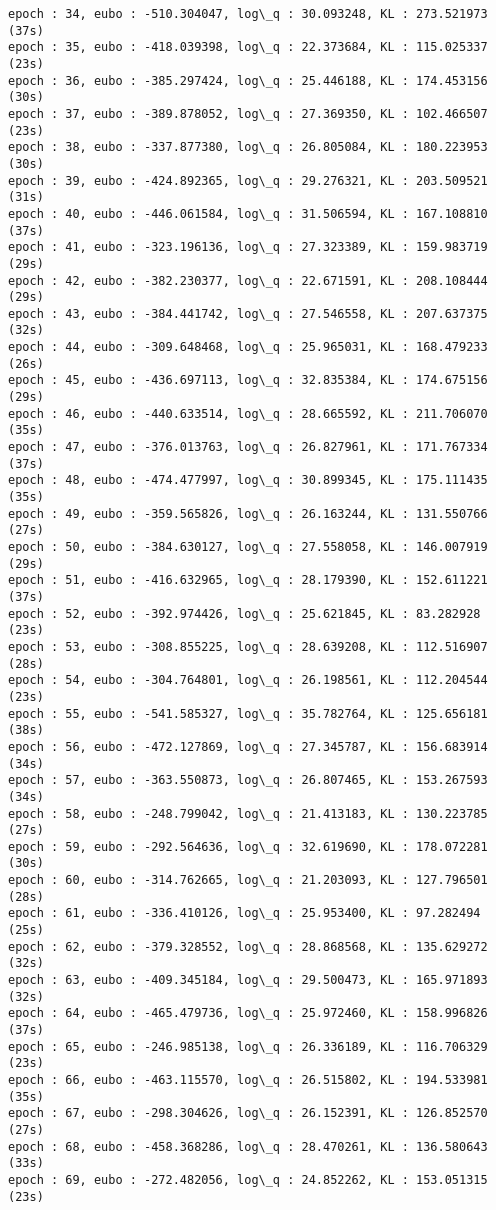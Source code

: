 \documentclass[11pt]{article}
\begin{document}
\begin{Verbatim}[commandchars=\\\{\}]
epoch : 34, eubo : -510.304047, log\_q : 30.093248, KL : 273.521973 (37s)
epoch : 35, eubo : -418.039398, log\_q : 22.373684, KL : 115.025337 (23s)
epoch : 36, eubo : -385.297424, log\_q : 25.446188, KL : 174.453156 (30s)
epoch : 37, eubo : -389.878052, log\_q : 27.369350, KL : 102.466507 (23s)
epoch : 38, eubo : -337.877380, log\_q : 26.805084, KL : 180.223953 (30s)
epoch : 39, eubo : -424.892365, log\_q : 29.276321, KL : 203.509521 (31s)
epoch : 40, eubo : -446.061584, log\_q : 31.506594, KL : 167.108810 (37s)
epoch : 41, eubo : -323.196136, log\_q : 27.323389, KL : 159.983719 (29s)
epoch : 42, eubo : -382.230377, log\_q : 22.671591, KL : 208.108444 (29s)
epoch : 43, eubo : -384.441742, log\_q : 27.546558, KL : 207.637375 (32s)
epoch : 44, eubo : -309.648468, log\_q : 25.965031, KL : 168.479233 (26s)
epoch : 45, eubo : -436.697113, log\_q : 32.835384, KL : 174.675156 (29s)
epoch : 46, eubo : -440.633514, log\_q : 28.665592, KL : 211.706070 (35s)
epoch : 47, eubo : -376.013763, log\_q : 26.827961, KL : 171.767334 (37s)
epoch : 48, eubo : -474.477997, log\_q : 30.899345, KL : 175.111435 (35s)
epoch : 49, eubo : -359.565826, log\_q : 26.163244, KL : 131.550766 (27s)
epoch : 50, eubo : -384.630127, log\_q : 27.558058, KL : 146.007919 (29s)
epoch : 51, eubo : -416.632965, log\_q : 28.179390, KL : 152.611221 (37s)
epoch : 52, eubo : -392.974426, log\_q : 25.621845, KL : 83.282928 (23s)
epoch : 53, eubo : -308.855225, log\_q : 28.639208, KL : 112.516907 (28s)
epoch : 54, eubo : -304.764801, log\_q : 26.198561, KL : 112.204544 (23s)
epoch : 55, eubo : -541.585327, log\_q : 35.782764, KL : 125.656181 (38s)
epoch : 56, eubo : -472.127869, log\_q : 27.345787, KL : 156.683914 (34s)
epoch : 57, eubo : -363.550873, log\_q : 26.807465, KL : 153.267593 (34s)
epoch : 58, eubo : -248.799042, log\_q : 21.413183, KL : 130.223785 (27s)
epoch : 59, eubo : -292.564636, log\_q : 32.619690, KL : 178.072281 (30s)
epoch : 60, eubo : -314.762665, log\_q : 21.203093, KL : 127.796501 (28s)
epoch : 61, eubo : -336.410126, log\_q : 25.953400, KL : 97.282494 (25s)
epoch : 62, eubo : -379.328552, log\_q : 28.868568, KL : 135.629272 (32s)
epoch : 63, eubo : -409.345184, log\_q : 29.500473, KL : 165.971893 (32s)
epoch : 64, eubo : -465.479736, log\_q : 25.972460, KL : 158.996826 (37s)
epoch : 65, eubo : -246.985138, log\_q : 26.336189, KL : 116.706329 (23s)
epoch : 66, eubo : -463.115570, log\_q : 26.515802, KL : 194.533981 (35s)
epoch : 67, eubo : -298.304626, log\_q : 26.152391, KL : 126.852570 (27s)
epoch : 68, eubo : -458.368286, log\_q : 28.470261, KL : 136.580643 (33s)
epoch : 69, eubo : -272.482056, log\_q : 24.852262, KL : 153.051315 (23s)

\end{Verbatim}
\end{document}

